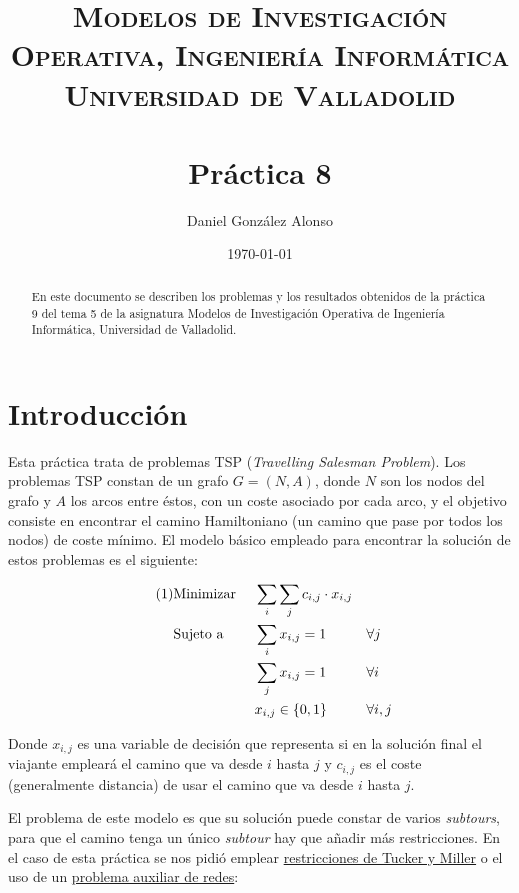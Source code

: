 \documentclass[a4paper,11pt]{article}
\title{
	\vspace{-25pt}
	\normalfont \Large \textsc{
		Modelos de Investigación Operativa,
        Ingeniería Informática\\
        Universidad de Valladolid
	}\\[10pt]
	\horrule{1pt}\\[10pt]
	\huge \textbf{
		Práctica 8
	}\\
	\horrule{1pt}
}
\author{
	\normalfont \Large Daniel González Alonso
}
\date{
	\normalfont \large \today
}
\newcommand\numberthis{							%
	\addtocounter{equation}{1}\tag{\theequation}
}
\begin{document}
\maketitle

\begin{abstract}
	En este documento se describen los problemas y los resultados obtenidos de la práctica 9 del tema 5 de la asignatura Modelos de Investigación Operativa de Ingeniería Informática, Universidad de Valladolid.
\end{abstract}

\section{Introducción}
Esta práctica trata de problemas TSP (\textit{Travelling Salesman Problem}). Los problemas TSP constan de un grafo ${G=(N,A)}$, donde ${N}$ son los nodos del grafo y ${A}$ los arcos entre éstos, con un coste asociado por cada arco, y el objetivo consiste en encontrar el camino Hamiltoniano (un camino que pase por todos los nodos) de coste mínimo. El modelo básico empleado para encontrar la solución de estos problemas es el siguiente:

\begin{align*}\numberthis
   	&\textrm{Minimizar }	&& \sum_{i}{ \sum_{j}{c_{i,j} \cdot x_{i,j}} }	&& \\
   	&\textrm{Sujeto a }		&& \sum_{i}{x_{i,j}} = 1	&& \forall j	\\
    &						&& \sum_{j}{x_{i,j}} = 1	&& \forall i	\\
	&						&& x_{i,j} \in \{0,1\}		&& \forall i,j	\\
\end{align*}

Donde ${x_{i,j}}$ es una variable de decisión que representa si en la solución final el viajante empleará el camino que va desde ${i}$ hasta ${j}$ y ${c_{i,j}}$ es el coste (generalmente distancia) de usar el camino que va desde ${i}$ hasta ${j}$.

El problema de este modelo es que su solución puede constar de varios \textit{subtours}, para que el camino tenga un único \textit{subtour} hay que añadir más restricciones. En el caso de esta práctica se nos pidió emplear \underline{restricciones de Tucker y Miller} o el uso de un \underline{problema auxiliar de redes}:
\end{document}
